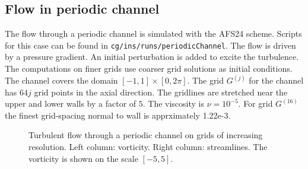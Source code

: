 \documentclass[11pt]{article}
\newcommand{\insDocDir}{\homeHenshaw/cgDoc/ins}
\begin{document}
\tableofcontents

\clearpage


\subsection{Flow in periodic channel}\label{sec:channelFlow}

The flow through a periodic channel is simulated with the AFS24 scheme.
Scripts for this case can be found in {\tt cg/ins/runs/periodicChannel}. 
The flow is driven by a pressure gradient. An initial perturbation is
added to excite the turbulence. The computations on finer
grids use coarser grid solutions as initial conditions.
The channel covers the domain $[-1,1]\times[0,2\pi]$. 
The grid $G^{(j)}$ for the channel has $64 j$ grid points in the axial direction. The gridlines
are stretched near the upper and lower walls by a factor of $5$. The viscosity is $\nu=10^{-5}$. 
For grid $G^{(16)}$ the finest grid-spacing normal to wall is apprximately 1.22e-3. 

{
\begin{figure}[hbt]
\newcommand{\figWidtha}{8.5cm}
\newcommand{\trimfig}[2]{\trimFig{#1}{#2}{0}{.21}{.45}{.40}}
\begin{center}
\end{center}
\caption{Turbulent flow through a periodic channel on grids of increasing resolution. Left column: vorticity.
    Right column: streamlines. The vorticity is shown on the scale $[-5,5]$.} 
\label{fig:periodicChannelFlow}
\end{figure}
}
\end{document}
